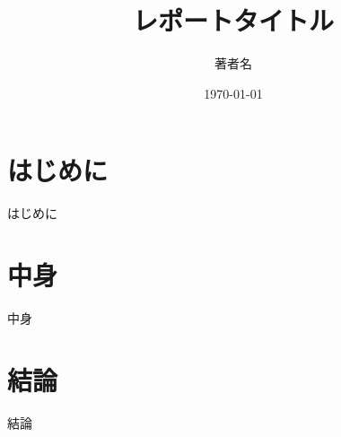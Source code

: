 \documentclass[a4paper,12pt]{article}
\title{レポートタイトル}
\author{著者名}
\date{\today}
\begin{document}
\maketitle

\section{はじめに}
はじめに

\section{中身}
中身

\section{結論}
結論
\end{document}
